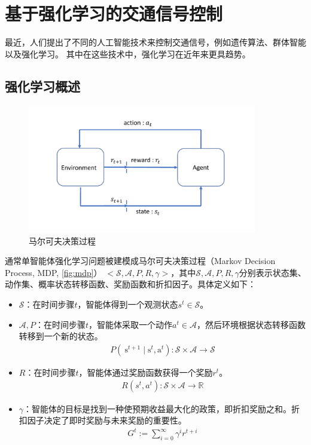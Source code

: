 \section{基于强化学习的交通信号控制}
最近，人们提出了不同的人工智能技术来控制交通信号，例如遗传算法、群体智能以及强化学习。 其中在这些技术中，强化学习在近年来更具趋势。
\subsection{强化学习概述}
\begin{figure}[htb]
    \includegraphics[width=10cm]{fig/rl.pdf}
    \caption{马尔可夫决策过程}
    \label{fig:mdp}
\end{figure}
通常单智能体强化学习问题被建模成马尔可夫决策过程（Markov Decision Process, MDP, \autoref{fig:mdp}） $<\mathcal{S}, \mathcal{A}, P, R, \gamma>$，其中$\mathcal{S}, \mathcal{A}, P, R, \gamma$分别表示状态集、动作集、概率状态转移函数、奖励函数和折扣因子。具体定义如下：
\begin{itemize}
    \item $\mathcal{S}$：在时间步骤$t$，智能体得到一个观测状态$s^t \in \mathcal{S}$。
    \item $\mathcal{A}, P$：在时间步骤$t$，智能体采取一个动作$a^t \in \mathcal{A}$，然后环境根据状态转移函数转移到一个新的状态。
    \begin{align}
        P\left(\mathrm{~s}^{t+1} \mid \mathrm{s}^{t}, \mathrm{a}^{t}\right): \mathcal{S} \times \mathcal{A} \rightarrow \mathcal{S}
    \end{align}
    \item $R$：在时间步骤$t$，智能体通过奖励函数获得一个奖励$r^t$。
    \begin{align}
        R\left(s^{t}, a^{t}\right): \mathcal{S} \times \mathcal{A} \rightarrow \mathbb{R}
    \end{align}
    \item $\gamma$：智能体的目标是找到一种使预期收益最大化的政策，即折扣奖励之和。折扣因子决定了即时奖励与未来奖励的重要性。
    \begin{align}
        G^{t}:=\sum_{i=0}^{\infty} \gamma^{i} r^{t+i}
    \end{align}
  \end{itemize}

